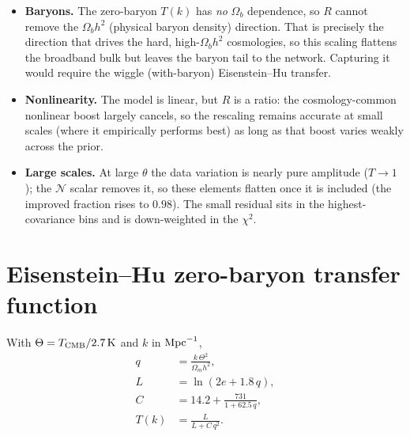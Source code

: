 \documentclass[11pt]{article}
\newcommand{\Om}{\Omega_m}
\newcommand{\Ob}{\Omega_b}
\begin{document}
\begin{itemize}[nosep]
  \item \textbf{Baryons.} The zero-baryon $T(k)$ has \emph{no}
        $\Ob$ dependence, so $R$ cannot remove the
        $\Ob h^2$ (physical baryon density) direction. That is
        precisely the direction that drives the hard,
        high-$\Ob h^2$ cosmologies, so this scaling flattens the
        broadband bulk but leaves the baryon tail to the network.
        Capturing it would require the wiggle (with-baryon)
        Eisenstein--Hu transfer.
  \item \textbf{Nonlinearity.} The model is linear, but $R$ is a
        ratio: the cosmology-common nonlinear boost largely
        cancels, so the rescaling remains accurate at small scales
        (where it empirically performs best) as long as that boost
        varies weakly across the prior.
  \item \textbf{Large scales.} At large $\theta$ the data variation
        is nearly pure amplitude ($T\to1$); the $\mathcal{N}$ scalar
        removes it, so these elements flatten once it is included
        (the improved fraction rises to $0.98$). The small residual
        sits in the highest-covariance bins and is down-weighted in
        the $\chi^2$.
\end{itemize}

\appendix
\section{Eisenstein--Hu zero-baryon transfer function}
\label{app:eh}

With $\Theta=T_{\rm CMB}/2.7\,{\rm K}$ and $k$ in
${\rm Mpc}^{-1}$,
\begin{align}
  q   &= \frac{k\,\Theta^2}{\Om h^2}, \\
  L   &= \ln\!\left(2e + 1.8\,q\right), \\
  C   &= 14.2 + \frac{731}{1+62.5\,q}, \\
  T(k)&= \frac{L}{L + C\,q^2}.
\end{align}
\end{document}
